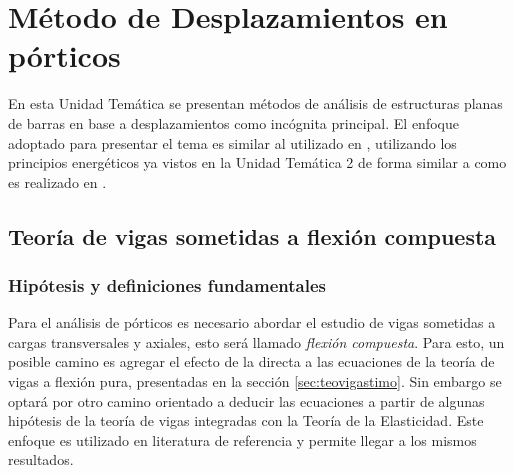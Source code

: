 %
%
%

\chapter[Método de Desplazamientos en pórticos]{Método de Desplazamientos en pórticos}

En esta Unidad Temática se presentan métodos de análisis de estructuras planas de barras en base a desplazamientos como incógnita principal. %
%
El enfoque adoptado para presentar el tema es similar al utilizado en \citep{Pilkey2002,Wunderlich2002}, utilizando los principios energéticos ya vistos en la Unidad Temática 2 de forma similar a como es realizado en \citep{Reddy2002b}.




\section{Teoría de vigas sometidas a flexión compuesta} \label{sec:teoviga}

\subsection{Hipótesis y definiciones fundamentales}

Para el análisis de pórticos es necesario abordar el estudio de vigas sometidas a cargas transversales y axiales, esto será llamado \textit{flexión compuesta}. %
%
Para esto, un posible camino es agregar el efecto de la directa a las ecuaciones de la teoría de vigas a flexión pura, presentadas en la sección \ref{sec:teovigastimo}. %
%
Sin embargo se optará por otro camino orientado a deducir las ecuaciones a partir de algunas hipótesis de la teoría de vigas integradas con la Teoría de la Elasticidad. %
%
Este enfoque es utilizado en literatura de referencia \citep{Wunderlich2002,Onate2013} y permite llegar a los mismos resultados.


